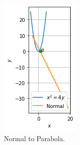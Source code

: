 \documentclass[journal,12pt,twocolumn]{IEEEtran}
\begin{document}
\begin{figure}[ht]
    \centering
    \includegraphics[width=\columnwidth]{PARABOLA.png}
    \caption{Normal to Parabola.}
    \label{fig:Normal to parabola.}
\end{figure}    
\end{document}
